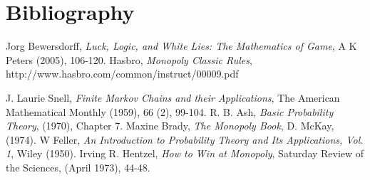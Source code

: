 \documentclass[12pt]{article}
\begin{document}
\section{Bibliography}
\begin{thebibliography}{9}

  Jorg Bewersdorff,
  \emph{Luck, Logic, and White Lies: The Mathematics of Game},
  A K Peters (2005),
  106-120.
  Hasbro,
  \emph{Monopoly Classic Rules},
  http://www.hasbro.com/common/instruct/00009.pdf
  
  J. Laurie Snell,
  \emph{Finite Markov Chains and their Applications},
  The American Mathematical Monthly (1959),
  66 (2),
  99-104.
  R. B. Ash,
  \emph{Basic Probability Theory},
  (1970),
  Chapter 7.
  Maxine Brady,
  \emph{The Monopoly Book},
  D. McKay, 
  (1974).
  W Feller,
  \emph{An Introduction to Probability Theory and Its Applications, Vol. 1},
  Wiley (1950).
  Irving R. Hentzel,
  \emph{How to Win at Monopoly},
  Saturday Review of the Sciences,
  (April 1973),
  44-48.
\end{thebibliography}
\end{document}
